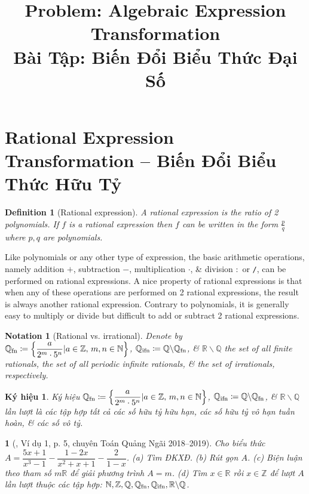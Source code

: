 \documentclass{article}
\title{Problem: Algebraic Expression Transformation\\Bài Tập: Biến Đổi Biểu Thức Đại Số}
\date{}
\newtheorem{baitoan}{}
\newtheorem{definition}{Definition}
\newtheorem{kyhieu}{Ký hiệu}
\newtheorem{notation}{Notation}
\begin{document}
\maketitle
\vspace{-2cm}


\section{Rational Expression Transformation -- Biến Đổi Biểu Thức Hữu Tỷ}

\begin{definition}[Rational expression]
	A {\rm rational expression} is the ratio of 2 polynomials. If $f$ is a rational expression then $f$ can be written in the form $\frac{p}{q}$ where $p,q$ are polynomials.
\end{definition}
Like polynomials or any other type of expression, the basic arithmetic operations, namely addition $+$, subtraction $-$, multiplication $\cdot$, \& division $:$ or {\tt/}, can be performed on rational expressions. A nice property of rational expressions is that when any of these operations are performed on 2 rational expressions, the result is always another rational expression. Contrary to polynomials, it is generally easy to multiply or divide but difficult to add or subtract 2 rational expressions.

\begin{notation}[Rational vs. irrational]
	Denote by $\mathbb{Q}_{\rm fn}\coloneqq\left\{\dfrac{a}{2^m\cdot5^n}|a\in\mathbb{Z},\,m,n\in\mathbb{N}\right\}$, $\mathbb{Q}_{\rm ifn}\coloneqq\mathbb{Q}\backslash\mathbb{Q}_{\rm fn}$, \& $\mathbb{R}\backslash\mathbb{Q}$ the set of all finite rationals, the set of all periodic infinite rationals, \& the set of irrationals, respectively.
\end{notation}

\begin{kyhieu}
	Ký hiệu $\mathbb{Q}_{\rm fn}\coloneqq\left\{\dfrac{a}{2^m\cdot5^n}|a\in\mathbb{Z},\,m,n\in\mathbb{N}\right\}$, $\mathbb{Q}_{\rm ifn}\coloneqq\mathbb{Q}\backslash\mathbb{Q}_{\rm fn}$, \& $\mathbb{R}\backslash\mathbb{Q}$ lần lượt là các tập hợp tất cả các số hữu tỷ hữu hạn, các số hữu tỷ vô hạn tuần hoàn, \& các số vô tỷ.
\end{kyhieu}

\begin{baitoan}[\cite{Lam_An_Tuan_Toan_9_dai_so}, Ví dụ 1, p. 5, chuyên Toán Quảng Ngãi 2018--2019]
	Cho biểu thức $A = \dfrac{5x + 1}{x^3 - 1} - \dfrac{1 - 2x}{x^2 + x + 1} - \dfrac{2}{1 - x}$. (a) Tìm {\rm ĐKXĐ}. (b) Rút gọn $A$. (c) Biện luận theo tham số $m\mathbb{R}$ để giải phương trình $A = m$. (d) Tìm $x\in\mathbb{R}$ rồi $x\in\mathbb{Z}$ để lượt $A$ lần lượt thuộc các tập hợp:  $\mathbb{N},\mathbb{Z},\mathbb{Q},\mathbb{Q}_{\rm fn},\mathbb{Q}_{\rm ifn},\mathbb{R}\backslash\mathbb{Q}$.
\end{baitoan}
\end{document}

